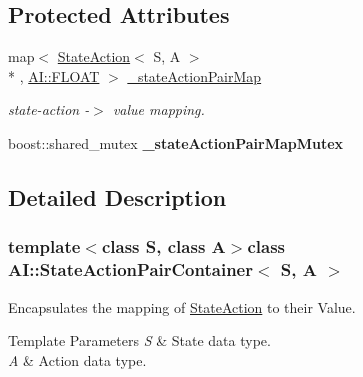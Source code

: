 \subsection*{Protected Attributes}
\begin{DoxyCompactItemize}
\item 
\hypertarget{classAI_1_1StateActionPairContainer_afeb95c4cb5d37ce8f8fd1a2b3518211b}{map$<$ \hyperlink{classAI_1_1StateAction}{State\-Action}$<$ S, A $>$\\*
, \hyperlink{namespaceAI_a41b74884a20833db653dded3918e05c3}{A\-I\-::\-F\-L\-O\-A\-T} $>$ \hyperlink{classAI_1_1StateActionPairContainer_afeb95c4cb5d37ce8f8fd1a2b3518211b}{\-\_\-state\-Action\-Pair\-Map}}\label{classAI_1_1StateActionPairContainer_afeb95c4cb5d37ce8f8fd1a2b3518211b}

\begin{DoxyCompactList}\small\item\em state-\/action -\/$>$ value mapping. \end{DoxyCompactList}\item 
\hypertarget{classAI_1_1StateActionPairContainer_a70b98a34845bd7744fa4e8b7c3163939}{boost\-::shared\-\_\-mutex {\bfseries \-\_\-state\-Action\-Pair\-Map\-Mutex}}\label{classAI_1_1StateActionPairContainer_a70b98a34845bd7744fa4e8b7c3163939}

\end{DoxyCompactItemize}


\subsection{Detailed Description}
\subsubsection*{template$<$class S, class A$>$class A\-I\-::\-State\-Action\-Pair\-Container$<$ S, A $>$}

Encapsulates the mapping of \hyperlink{classAI_1_1StateAction}{State\-Action} to their Value. 


\begin{DoxyTemplParams}{Template Parameters}
{\em S} & State data type. \\
\hline
{\em A} & Action data type. \\
\hline
\end{DoxyTemplParams}


